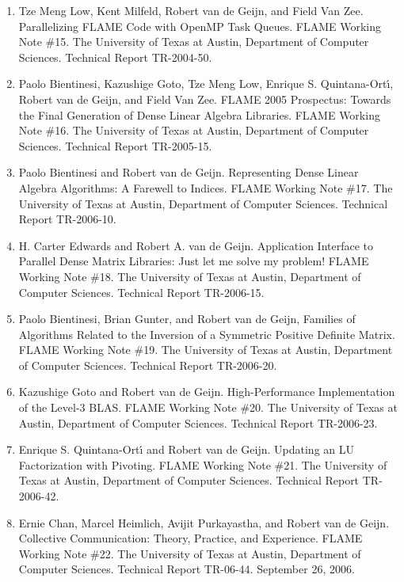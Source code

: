 \begin{enumerate}
\item
      Tze Meng Low, Kent Milfeld, Robert van de Geijn, and Field Van Zee. Parallelizing FLAME Code with OpenMP Task Queues. FLAME Working Note \#15. The University of Texas at Austin, Department of Computer Sciences. Technical Report TR-2004-50.

\item
      Paolo Bientinesi, Kazushige Goto, Tze Meng Low, Enrique S. Quintana-Ort\'{\i}, Robert van de Geijn, and Field Van Zee. FLAME 2005 Prospectus: Towards the Final Generation of Dense Linear Algebra Libraries. FLAME Working Note \#16. The University of Texas at Austin, Department of Computer Sciences. Technical Report TR-2005-15.

\item
      Paolo Bientinesi and Robert van de Geijn. Representing Dense Linear Algebra Algorithms: A Farewell to Indices. FLAME Working Note \#17. The University of Texas at Austin, Department of Computer Sciences. Technical Report TR-2006-10.

\item
      H. Carter Edwards and Robert A. van de Geijn. Application Interface to Parallel Dense Matrix Libraries: Just let me solve my problem! FLAME Working Note \#18. The University of Texas at Austin, Department of Computer Sciences. Technical Report TR-2006-15.

\item
      Paolo Bientinesi, Brian Gunter, and Robert van de Geijn, Families of Algorithms Related to the Inversion of a Symmetric Positive Definite Matrix. FLAME Working Note \#19. The University of Texas at Austin, Department of Computer Sciences. Technical Report TR-2006-20.

\item
      Kazushige Goto and Robert van de Geijn. High-Performance Implementation of the Level-3 BLAS. FLAME Working Note \#20. The University of Texas at Austin, Department of Computer Sciences. Technical Report TR-2006-23.

\item
      Enrique S. Quintana-Ort\'{\i} and Robert van de Geijn. Updating an LU Factorization with Pivoting. FLAME Working Note \#21. The University of Texas at Austin, Department of Computer Sciences. Technical Report TR-2006-42.

\item
      Ernie Chan, Marcel Heimlich, Avijit Purkayastha, and Robert van de Geijn. Collective Communication: Theory, Practice, and Experience. FLAME Working Note \#22. The University of Texas at Austin, Department of Computer Sciences. Technical Report TR-06-44. September 26, 2006.


\end{enumerate}

